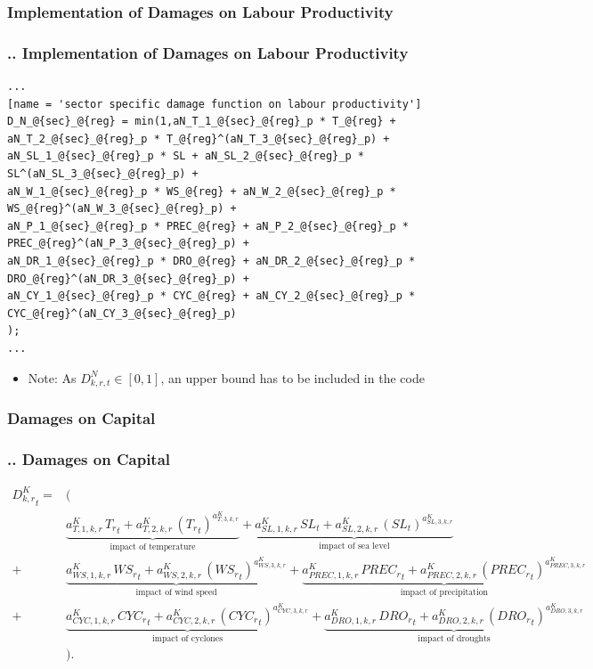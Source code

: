 \documentclass[11pt,aspectratio=169]{beamer}
\begin{document}
\subsubsection{Implementation of Damages on Labour Productivity}
\begin{frame}[fragile]
\frametitle{{\thesection.\thesubsection.\thesubsubsection} Implementation of Damages on Labour Productivity}
\begin{lstlisting}[frame = single]
...
[name = 'sector specific damage function on labour productivity']
D_N_@{sec}_@{reg} = min(1,aN_T_1_@{sec}_@{reg}_p * T_@{reg} + aN_T_2_@{sec}_@{reg}_p * T_@{reg}^(aN_T_3_@{sec}_@{reg}_p) + 
aN_SL_1_@{sec}_@{reg}_p * SL + aN_SL_2_@{sec}_@{reg}_p * SL^(aN_SL_3_@{sec}_@{reg}_p) +
aN_W_1_@{sec}_@{reg}_p * WS_@{reg} + aN_W_2_@{sec}_@{reg}_p * WS_@{reg}^(aN_W_3_@{sec}_@{reg}_p) + 
aN_P_1_@{sec}_@{reg}_p * PREC_@{reg} + aN_P_2_@{sec}_@{reg}_p * PREC_@{reg}^(aN_P_3_@{sec}_@{reg}_p) + 
aN_DR_1_@{sec}_@{reg}_p * DRO_@{reg} + aN_DR_2_@{sec}_@{reg}_p * DRO_@{reg}^(aN_DR_3_@{sec}_@{reg}_p) +
aN_CY_1_@{sec}_@{reg}_p * CYC_@{reg} + aN_CY_2_@{sec}_@{reg}_p * CYC_@{reg}^(aN_CY_3_@{sec}_@{reg}_p)
);
...
\end{lstlisting}
\begin{itemize}
	\scriptsize
	\item Note: As $D_{k,r,t}^N \in [0,1]$, an upper bound has to be included in the code
\end{itemize}
\end{frame}


\subsubsection{Damages on Capital}
\begin{frame}
\frametitle{{\thesection.\thesubsection.\thesubsubsection} Damages on Capital}
\scriptsize
\begin{align*}
{{D^{K}_{k,r}}_{t}}=& \Big( \nonumber \\
&\underbrace{{{a^{K}_{T,1,k,r}}} \, {{T_{r}}_{t}}+{{a^{K}_{T,2,k,r}}}\, \left({T_{r}}_{t}\right)^{a^{K}_{T,3,k,r}}}_{\mbox{impact of temperature}}+ \underbrace{{{a^{K}_{SL,1,k,r}}}\, {{SL}_{t}}+{{a^{K}_{SL,2,k,r}}}\, \left({SL}_{t}\right)^{{{a^{K}_{SL,3,k,r}}}}}_{\mbox{impact of sea level}} \nonumber \\
+ & \underbrace{{{a^{K}_{WS,1,k,r}}}\, {{WS_{r}}_{t}}+{{a^{K}_{WS,2,k,r}}}\, \left({WS_{r}}_{t}\right)^{{{a^{K}_{WS,3,k,r}}}}}_{\mbox{impact of wind speed}}
+ \underbrace{{{a^{K}_{PREC,1,k,r}}} \, {{PREC_{r}}_{t}}+{{a^{K}_{PREC,2,k,r}}}\, \left({PREC_{r}}_{t}\right)^{{{a^{K}_{PREC,3,k,r}}}}}_{\mbox{impact of precipitation}} \nonumber \\
+ & \underbrace{{{a^{K}_{CYC,1,k,r}}}\, {{CYC_{r}}_{t}}+{{a^{K}_{CYC,2,k,r}}}\, \left({CYC_{r}}_{t}\right)^{{{a^{K}_{CYC,3,k,r}}}}}_{\mbox{impact of cyclones}}
+ \underbrace{{{a^{K}_{DRO,1,k,r}}} \, {{DRO_{r}}_{t}}+{{a^{K}_{DRO,2,k,r}}}\, \left({DRO_{r}}_{t}\right)^{{{a^{K}_{DRO,3,k,r}}}}}_{\mbox{impact of droughts}} \nonumber \\
&\Big).
\end{align*}
\end{frame}
\end{document}
